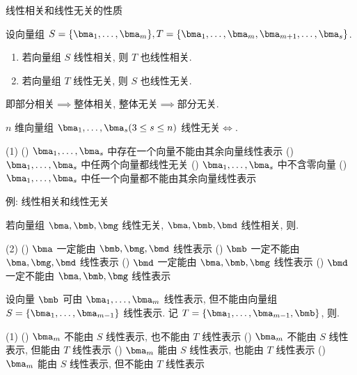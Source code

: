 \begin{frame}{线性相关和线性无关的性质}
	\onslide<+->
	\begin{theorem}
		设向量组 $S=\{\bma_1,\dots,\bma_m\},T=\{\bma_1,\dots,\bma_m,\bma_{m+1},\dots,\bma_s\}$.
		\begin{enumerate}
			\item 若向量组 $S$ 线性相关, 则 $T$ 也线性相关.
			\item 若向量组 $T$ 线性无关, 则 $S$ 也线性无关.
		\end{enumerate}
	\end{theorem}
	\onslide<+->
	即\alert{部分相关$\implies$整体相关, 整体无关$\implies$部分无关}.
	\onslide<+->
	\begin{example}
		$n$ 维向量组 $\bma_1,\dots,\bma_s (3\le s\le n)$ 线性无关$\iff$.
		\begin{taskschoice}(1)
			() $\bma_1,\dots,\bma_s$ 中存在一个向量不能由其余向量线性表示
			() $\bma_1,\dots,\bma_s$ 中任两个向量都线性无关
			() $\bma_1,\dots,\bma_s$ 中不含零向量
			() $\bma_1,\dots,\bma_s$ 中任一个向量都不能由其余向量线性表示
		\end{taskschoice}
	\end{example}
\end{frame}


\begin{frame}{例: 线性相关和线性无关}
	\onslide<+->
	\begin{exercise}
		若向量组 $\bma,\bmb,\bmg$ 线性无关, $\bma,\bmb,\bmd$ 线性相关, 则\fillbraceframe{C}.
		\begin{taskschoice}(2)
			() $\bma$ 一定能由 $\bmb,\bmg,\bmd$ 线性表示
			() $\bmb$ 一定不能由 $\bma,\bmg,\bmd$ 线性表示
			() $\bmd$ 一定能由 $\bma,\bmb,\bmg$ 线性表示
			() $\bmd$ 一定不能由 $\bma,\bmb,\bmg$ 线性表示
		\end{taskschoice}
	\end{exercise}
	\onslide<+->
	\begin{example}
		设向量 $\bmb$ 可由 $\bma_1,\dots,\bma_m$ 线性表示, 但不能由向量组 $S=\{\bma_1,\dots,\bma_{m-1}\}$ 线性表示. 记 $T=\{\bma_1,\dots,\bma_{m-1},\bmb\}$, 则\fillbraceframe{B}.
		\begin{taskschoice}(1)
			() $\bma_m$ 不能由 $S$ 线性表示, 也不能由 $T$ 线性表示
			() $\bma_m$ 不能由 $S$ 线性表示, 但能由 $T$ 线性表示
			() $\bma_m$ 能由 $S$ 线性表示, 也能由 $T$ 线性表示
			() $\bma_m$ 能由 $S$ 线性表示, 但不能由 $T$ 线性表示
		\end{taskschoice}
	\end{example}
\end{frame}


